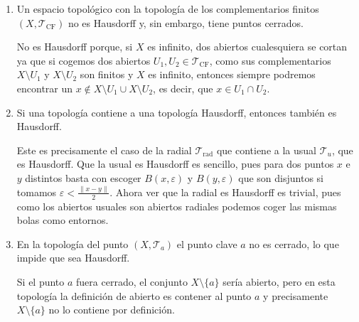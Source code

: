\begin{obs}
\begin{enumerate}
    \item Un espacio topológico con la topología de los complementarios finitos $\left( X, \mathcal{T}_{\text{CF}} \right)$ no es Hausdorff y, sin embargo, tiene puntos cerrados.
    
    No es Hausdorff porque, si $X$ es infinito, dos abiertos cualesquiera se cortan ya que si cogemos dos abiertos $U_1, U_2 \in \mathcal{T}_{\text{CF}}$, como sus complementarios $X \setminus U_1$ y $X \setminus U_2$ son finitos y $X$ es infinito, entonces siempre podremos encontrar un $x \not\in X \setminus U_1 \cup X \setminus U_2$, es decir, que $x \in U_1 \cap U_2$. 

    \item Si una topología contiene a una topología Hausdorff, entonces también es Hausdorff.
    
    Este es precisamente el caso de la radial $\mathcal{T}_{\text{rad}}$ que contiene a la usual $\mathcal{T}_{u}$, que es Hausdorff.
	Que la usual es Hausdorff es sencillo, pues para dos puntos $x$ e $y$ distintos basta con escoger $B\left( x, \varepsilon \right)$ y $B\left( y, \varepsilon \right)$ que son disjuntos si tomamos $\varepsilon < \frac{\lVert x - y \rVert}{2}$. Ahora ver que la radial es Hausdorff es trivial, pues como los abiertos usuales son abiertos radiales podemos coger las mismas bolas como entornos.

    \item En la topología del punto $\left( X, \mathcal{T}_a \right)$ el punto clave $a$ no es cerrado, lo que impide que sea Hausdorff. 
    
    Si el punto $a$ fuera cerrado, el conjunto $X\setminus\{a\}$ sería abierto, pero en esta topología la definición de abierto es contener al punto $a$ y precisamente $X\setminus\{a\}$ no lo contiene por definición.
\end{enumerate}
\end{obs}

